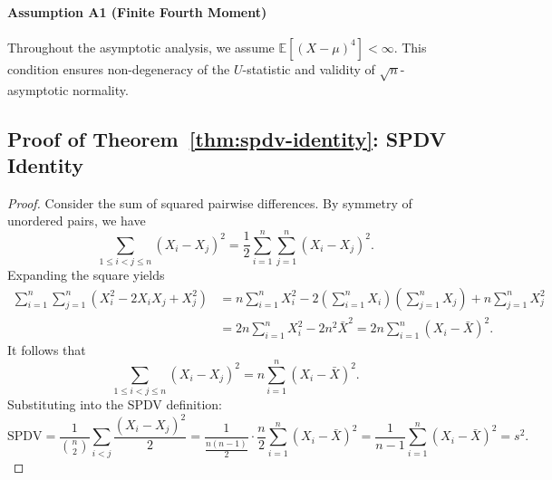 \documentclass[12pt,a4paper]{article}
\begin{document}
\paragraph{Assumption A1 (Finite Fourth Moment)}
Throughout the asymptotic analysis, we assume $\mathbb{E}[(X-\mu)^4] < \infty$.
This condition ensures non-degeneracy of the $U$-statistic and validity of $\sqrt{n}$-asymptotic normality.

\subsection{Proof of Theorem~\ref{thm:spdv-identity}: SPDV Identity}
\label{app:spdv-proof}
\begin{proof}
Consider the sum of squared pairwise differences. By symmetry of unordered pairs, we have
\begin{equation}
    \sum_{1\le i<j\le n} (X_i-X_j)^2 = \frac{1}{2}\sum_{i=1}^n\sum_{j=1}^n (X_i-X_j)^2.
\end{equation}
Expanding the square yields
\begin{align}
    \sum_{i=1}^n\sum_{j=1}^n(X_i^2-2X_iX_j+X_j^2) &= n\sum_{i=1}^nX_i^2-2\left(\sum_{i=1}^nX_i\right)\left(\sum_{j=1}^nX_j\right)+n\sum_{j=1}^nX_j^2 \nonumber \\
    &= 2n\sum_{i=1}^nX_i^2-2n^2\bar{X}^2 = 2n\sum_{i=1}^n(X_i-\bar{X})^2.
\end{align}
It follows that
\begin{equation}
    \sum_{1 \le i<j \le n}(X_i-X_j)^2 = n\sum_{i=1}^n(X_i-\bar{X})^2.
\end{equation}
Substituting into the SPDV definition:
\begin{equation}
    \text{SPDV} = \frac{1}{\binom{n}{2}}\sum_{i<j}\frac{(X_i-X_j)^2}{2} = \frac{1}{\frac{n(n-1)}{2}} \cdot \frac{n}{2}\sum_{i=1}^n(X_i-\bar{X})^2 = \frac{1}{n-1}\sum_{i=1}^n(X_i-\bar{X})^2 = s^2.
\end{equation}
\end{proof}
\end{document}
